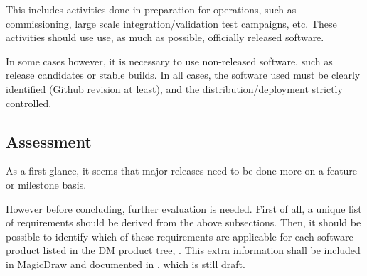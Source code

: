 This includes activities done in preparation for operations, such as commissioning, 
large scale integration/validation test campaigns, etc. These activities should use use,  as much as possible,  officially released software.

In some cases however, it is necessary to use non-released software, such as release candidates or stable builds.
In all cases, the software used must be clearly identified (Github revision at least), and the distribution/deployment strictly controlled.


\subsection{Assessment} \label{sec:assessment}

As a first glance, it seems that major releases need to be done more on a feature or milestone basis.

However before concluding, further evaluation is needed.
First of all, a unique list of requirements should be derived from the above subsections. 
Then, it should be possible to identify which of these requirements are applicable for each software product listed in the \gls{DM} product tree, .
This extra information shall be included in MagicDraw and documented in , which is still draft.


